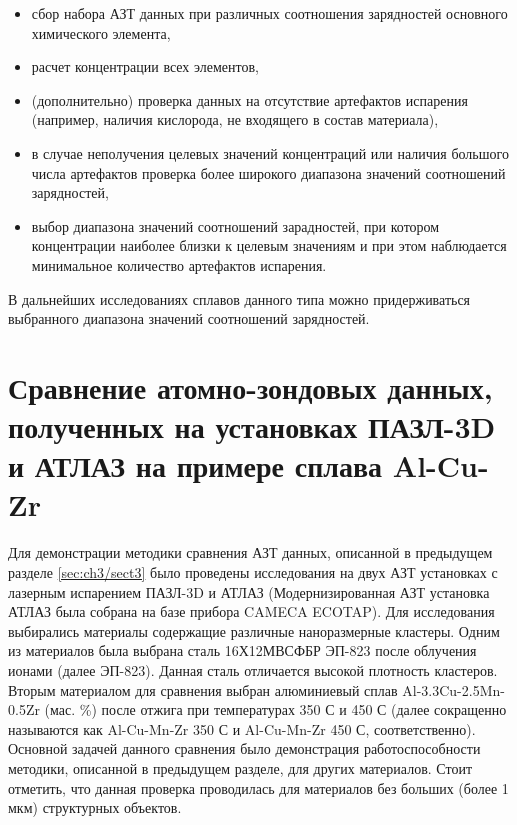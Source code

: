 \begin{itemize}
	\item сбор набора АЗТ данных при различных соотношения зарядностей основного химического элемента,
	\item расчет концентрации всех элементов,	
	\item (дополнительно) проверка данных на отсутствие артефактов испарения (например, наличия кислорода, не входящего в состав материала),
	\item в случае неполучения целевых значений концентраций или наличия большого числа артефактов проверка более широкого диапазона значений соотношений зарядностей,
	\item выбор диапазона значений соотношений зарадностей, при котором концентрации наиболее близки к целевым значениям и при этом наблюдается минимальное количество артефактов испарения.	
\end{itemize}
В дальнейших исследованиях сплавов данного типа можно придерживаться выбранного диапазона значений соотношений зарядностей.

\FloatBarrier

\section{Сравнение атомно-зондовых данных, полученных на установках ПАЗЛ-3D и АТЛАЗ на примере сплава Al-Cu-Zr}\label{sec:ch3/sect4}

Для демонстрации методики сравнения АЗТ данных, описанной в предыдущем разделе \cref{sec:ch3/sect3} было проведены исследования на двух АЗТ установках с лазерным испарением ПАЗЛ-3D и АТЛАЗ (Модернизированная АЗТ установка АТЛАЗ была собрана на базе прибора CAMECA ECOTAP). Для исследования выбирались материалы содержащие различные наноразмерные кластеры. Одним из материалов была выбрана сталь 16Х12МВСФБР ЭП-823 \cite{Porollo04} после облучения ионами (далее ЭП-823). Данная сталь отличается высокой плотность кластеров. Вторым материалом для сравнения выбран алюминиевый сплав Al-3.3Cu-2.5Mn-0.5Zr (мас. \%) после отжига при температурах 350 \textdegree С и 450 \textdegree С \cite{Belov22,Belov21} (далее сокращенно называются как Al-Cu-Mn-Zr 350 \textdegree С и Al-Cu-Mn-Zr 450 \textdegree С, соответственно). Основной задачей данного сравнения было демонстрация работоспособности методики, описанной в предыдущем разделе, для других материалов. Стоит отметить, что данная проверка проводилась для материалов без больших (более 1 мкм) структурных объектов. 

